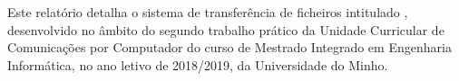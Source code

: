 
Este relatório detalha o sistema  de transferência de ficheiros intitulado \SYS, desenvolvido no âmbito do segundo trabalho prático da Unidade Curricular de Comunicações por Computador do curso de Mestrado Integrado em Engenharia Informática, no ano letivo de 2018/2019, da Universidade do Minho.

